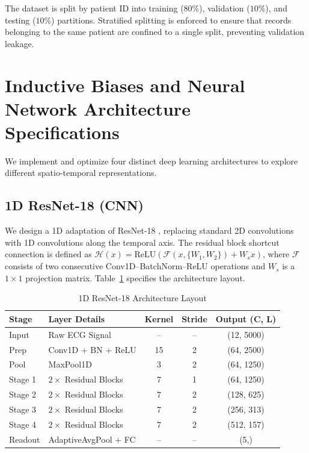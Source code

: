 \documentclass[14pt]{extarticle}
\begin{document}
The dataset is split by patient ID into training ($80\%$), validation ($10\%$), and testing ($10\%$) partitions. Stratified splitting is enforced to ensure that records belonging to the same patient are confined to a single split, preventing validation leakage.

\section{Inductive Biases and Neural Network Architecture Specifications}
\label{sec:models}
We implement and optimize four distinct deep learning architectures to explore different spatio-temporal representations.

\subsection{1D ResNet-18 (CNN)}
We design a 1D adaptation of ResNet-18 \cite{he2016deep, ribeiro2020automatic}, replacing standard 2D convolutions with 1D convolutions along the temporal axis. The residual block shortcut connection is defined as $\mathcal{H}(x) = \text{ReLU}(\mathcal{F}(x,\{W_1, W_2\}) + W_s x)$, where $\mathcal{F}$ consists of two consecutive Conv1D--BatchNorm--ReLU operations and $W_s$ is a $1\times1$ projection matrix. Table~\ref{tab:resnet_arch} specifies the architecture layout.

\begin{table}[H]
\caption{1D ResNet-18 Architecture Layout}
\label{tab:resnet_arch}
\centering
\begin{tabular}{|l|l|c|c|c|}
\hline
\textbf{Stage} & \textbf{Layer Details} & \textbf{Kernel} & \textbf{Stride} & \textbf{Output (C, L)} \\
\hline
Input  & Raw ECG Signal             & --  & --  & (12, 5000) \\
\hline
Prep   & Conv1D + BN + ReLU         & 15  & 2   & (64, 2500) \\
\hline
Pool   & MaxPool1D                  & 3   & 2   & (64, 1250) \\
\hline
Stage 1 & $2\times$ Residual Blocks & 7   & 1   & (64, 1250) \\
\hline
Stage 2 & $2\times$ Residual Blocks & 7   & 2   & (128, 625) \\
\hline
Stage 3 & $2\times$ Residual Blocks & 7   & 2   & (256, 313) \\
\hline
Stage 4 & $2\times$ Residual Blocks & 7   & 2   & (512, 157) \\
\hline
Readout & AdaptiveAvgPool + FC      & --  & --  & (5,)       \\
\hline
\end{tabular}
\end{table}
\end{document}
